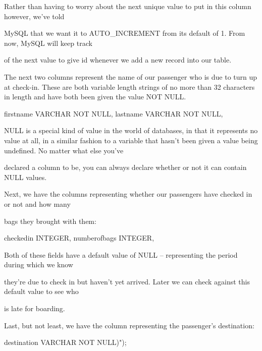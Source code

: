 \documentclass[a4paper,11pt]{book}
\begin{document}
\noindent 

\noindent Rather than having to worry about the next unique value to put in this column however, we've told

\noindent MySQL that we want it to AUTO\_INCREMENT from its default of 1. From now, MySQL will keep track

\noindent of the next value to give id whenever we add a new record into our table.

\noindent 

\noindent The next two columns represent the name of our passenger who is due to turn up at check-in. These are both variable length strings of no more than 32 characters in length and have both been given the value NOT NULL.

\noindent 

\noindent firstname  VARCHAR NOT NULL, lastname VARCHAR NOT NULL,

\noindent 

\noindent NULL is a special kind of value in the world of databases, in that it represents no value at all, in a similar fashion to a variable that hasn't been given a value being undefined. No matter what else you've

\noindent declared a column to be, you can always declare whether or not it can contain NULL values.

\noindent 

\noindent 

\noindent Next, we have the columns representing whether our passengers have checked in or not and how many

\noindent bags they brought with them:

\noindent 

\noindent checkedin INTEGER, numberofbags INTEGER,

\noindent 

\noindent Both of these fields have a default value of NULL -- representing the period during which we know

\noindent they're due to check in but haven't yet arrived. Later we can check against this default value to see who

\noindent is late for boarding.

\noindent 

\noindent Last, but not least, we have the column representing the passenger's destination:

\noindent 

\noindent destination VARCHAR NOT NULL)");
\end{document}
